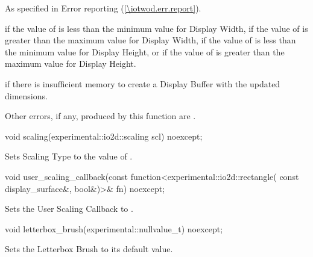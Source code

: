 \begin{itemdescr}
\pnum
\throws
As specified in Error reporting (\ref{\iotwod.err.report}).

\pnum
\errors
{} if the value of  is less than the minimum value for Display Width, if the value of  is greater than the maximum value for Display Width, if the value of  is less than the minimum value for Display Height, or if the value of  is greater than the maximum value for Display Height.

 if there is insufficient memory to create a Display Buffer with the updated dimensions.

Other errors, if any, produced by this function are .
\end{itemdescr}

\begin{itemdecl}
void scaling(experimental::io2d::scaling scl) noexcept;
\end{itemdecl}
\begin{itemdescr}
\pnum
\effects
Sets Scaling Type to the value of .
\end{itemdescr}

\begin{itemdecl}
void user_scaling_callback(const function<experimental::io2d::rectangle(
  const display_surface&, bool&)>& fn) noexcept;
\end{itemdecl}
\begin{itemdescr}
\pnum
\effects
Sets the User Scaling Callback to .
\end{itemdescr}

\begin{itemdecl}
void letterbox_brush(experimental::nullvalue_t) noexcept;
\end{itemdecl}
\begin{itemdescr}
\pnum
\effects
Sets the Letterbox Brush to its default value.
\end{itemdescr}

